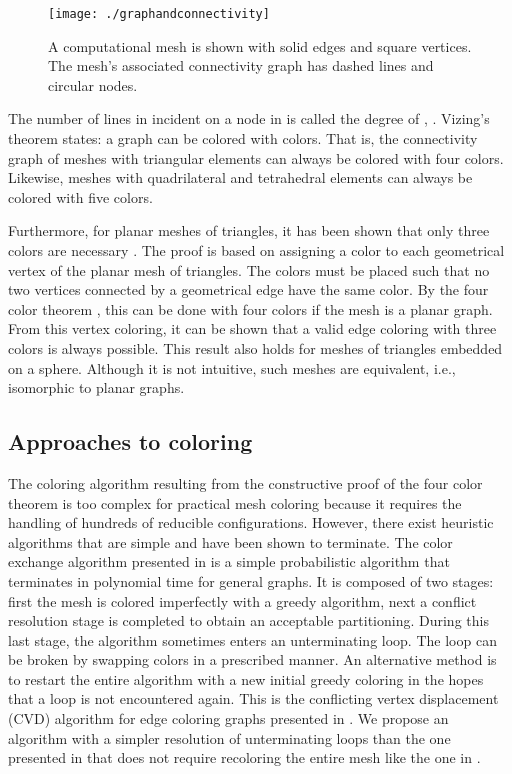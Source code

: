 \documentclass[12pt]{article}
\begin{document}
\begin{figure}
\centering
\texttt{[image: ./graphandconnectivity]}
\caption{A computational mesh is shown with solid edges and square vertices. The mesh's associated connectivity graph has dashed lines and circular nodes.}
\label{fig:graphandconnectivity}
\end{figure}


The number of lines in  incident on a node  in  is called the degree of , .  Vizing's theorem \cite{vizing} states: a graph can be colored with  colors.  That is, the connectivity graph of meshes with triangular elements can always be colored with four colors.  Likewise, meshes with quadrilateral and tetrahedral elements can always be colored with five colors.

Furthermore, for planar meshes of triangles, it has been shown that only three colors are necessary \cite{wilson1996introduction}.  The proof is based on assigning a color to each geometrical vertex  of the planar mesh of triangles.  The colors must be placed such that no two vertices connected by a geometrical edge have the same color.  By the four color theorem \cite{appel}, this can be done with four colors if the mesh is a planar graph.  From this vertex coloring, it can be shown that a valid edge coloring with three colors is always possible.  This result also holds for meshes of triangles embedded on a sphere.  Although it is not intuitive, such meshes are equivalent, i.e., isomorphic to planar graphs.



\subsection{Approaches to coloring}
The coloring algorithm resulting from the constructive proof of the four color theorem \cite{appel} is too complex for practical mesh coloring because it requires the handling of hundreds of reducible configurations.  However, there exist heuristic algorithms that are simple and have been shown to terminate.  The color exchange algorithm presented in \cite{complexcolors} is a simple probabilistic algorithm that terminates in polynomial time for general graphs.  It is composed of two stages: first the mesh is colored imperfectly with a greedy algorithm, next a conflict resolution stage is completed to obtain an acceptable partitioning.  During this last stage, the algorithm sometimes enters an unterminating loop.  The loop can be broken by swapping colors in a prescribed manner.  An alternative method is to restart the entire algorithm with a new initial greedy coloring in the hopes that a loop is not encountered again.  This is the conflicting vertex displacement (CVD) algorithm for edge coloring graphs presented in \cite{fiol2012}.  We propose an algorithm with a simpler resolution of unterminating loops than the one presented in \cite{complexcolors} that does not require recoloring the entire mesh like the one in \cite{fiol2012}.
\end{document}
